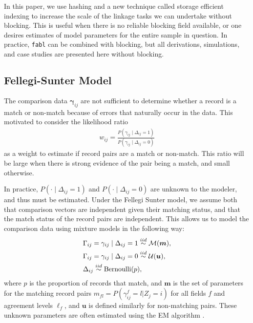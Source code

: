 \documentclass[ba]{imsart}
\begin{document}
In this paper, we use hashing and a new technique called storage efficient indexing to increase the scale of the linkage tasks we can undertake without blocking. This is useful when there is no reliable blocking field available, or one desires estimates of model parameters for the entire sample in question. In practice, \texttt{fabl} can be combined with blocking, but all derivations, simulations, and case studies are presented here without blocking. 

\subsection{Fellegi-Sunter Model}
\label{fellegi-sunter}
The comparison data $\bm{\gamma}_{ij}$ are not sufficient to determine whether a record is a match or non-match because of errors that naturally occur in the data. This motivated \cite{fellegi_theory_1969} to consider the likelihood ratio
\begin{align}
	\label{eqn:wts}
	w_{ij} = \frac{P(\gamma_{ij} \mid \Delta_{ij} = 1)}{P(\gamma_{ij} \mid \Delta_{ij} = 0)}
\end{align}
as a weight to estimate if record pairs are a match or non-match. This ratio will be large when there is strong evidence of the pair being a match, and small otherwise. 

In practice, $P(\cdot \mid \Delta_{ij} = 1)$ and $P(\cdot \mid \Delta_{ij} = 0)$ are unknown to the modeler, and thus must be estimated. Under the Fellegi Sunter model, we assume both that comparison vectors are independent given their matching status, and that the match status of the record pairs are independent. This allows us to model the comparison data using mixture models in the following way:
\begin{align}
	&\Gamma_{ij} = \gamma_{ij} \mid \Delta_{ij} = 1 \stackrel{iid}{\sim} \mathcal{M}(\bm{m}), \\
	&\Gamma_{ij} = \gamma_{ij} \mid \Delta_{ij} = 0  \stackrel{iid}{\sim} \mathcal{U}(\bm{u}), \notag\\
	& \Delta_{ij}   \stackrel{iid}{\sim} \text{Bernoulli}(p), \notag
\end{align}
where $p$ is the proportion of records that match, and $\bm{m}$ is the set of parameters for the matching record pairs $m_{fl} = P(\gamma_{ij}^f = l|Z_j =i)$ for all fields $f$ and agreement levels $\ell_f$, and $\bm{u}$ is defined similarly for non-matching pairs. These unknown parameters are often estimated using the EM algorithm \citep{Winkler1988}. 
\end{document}
